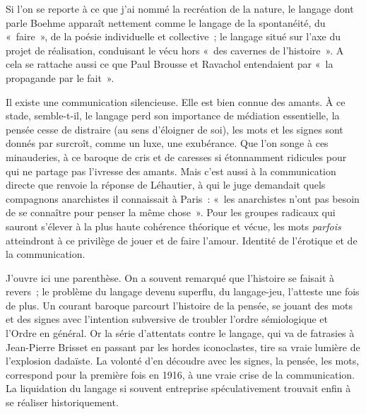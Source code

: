 \documentclass[french,twoside]{book} %
\newcommand{\astermono}{\medskip\centerline{\color{rubric}\large\selectfont{\syms ✻}}\medskip\par}%
\begin{document}
\noindent Si l’on se reporte à ce que j’ai nommé la recréation de la nature, le langage dont parle Boehme apparaît nettement comme le langage de la spontanéité, du « faire », de la poésie individuelle et collective ; le langage situé sur l’axe du projet de réalisation, conduisant le vécu hors « des cavernes de l’histoire ». A cela se rattache aussi ce que Paul Brousse et Ravachol entendaient par « la propagande par le fait ».\par

\astermono

\noindent Il existe une communication silencieuse. Elle est bien connue des amants. À ce stade, semble-t-il, le langage perd son importance de médiation essentielle, la pensée cesse de distraire (au sens d’éloigner de soi), les mots et les signes sont donnés par surcroît, comme un luxe, une exubérance. Que l’on songe à ces minauderies, à ce baroque de cris et de caresses si étonnamment ridicules pour qui ne partage pas l’ivresse des amants. Mais c’est aussi à la communication directe que renvoie la réponse de Léhautier, à qui le juge demandait quels compagnons anarchistes il connaissait à Paris : « les anarchistes n’ont pas besoin de se connaître pour penser la même chose ». Pour les groupes radicaux qui sauront s’élever à la plus haute cohérence théorique et vécue, les mots \emph{parfois} atteindront à ce privilège de jouer et de faire l’amour. Identité de l’érotique et de la communication.\par
J’ouvre ici une parenthèse. On a souvent remarqué que l’histoire se faisait à revers ; le problème du langage devenu superflu, du langage-jeu, l’atteste une fois de plus. Un courant baroque parcourt l’histoire de la pensée, se jouant des mots et des signes avec l’intention subversive de troubler l’ordre sémiologique et l’Ordre en général. Or la série d’attentats contre le langage, qui va de fatrasies à Jean-Pierre Brisset en passant par les hordes iconoclastes, tire sa vraie lumière de l’explosion dadaïste. La volonté d’en découdre avec les signes, la pensée, les mots, correspond pour la première fois en 1916, à une vraie crise de la communication. La liquidation du langage si souvent entreprise spéculativement trouvait enfin à se réaliser historiquement.\par
\end{document}
